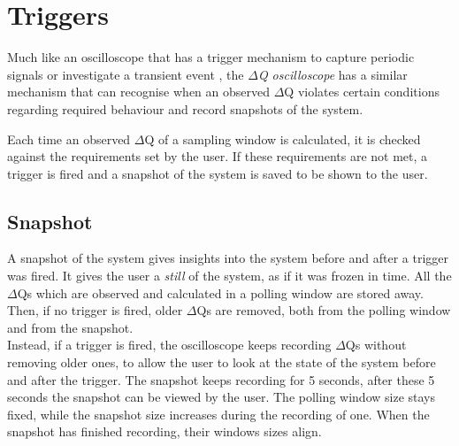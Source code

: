 \section{Triggers}
    Much like an oscilloscope that has a trigger mechanism to capture periodic signals or investigate a transient event \cite{osc-t}, the \textit{$\Delta$Q oscilloscope} has a similar mechanism that can recognise when an observed $\Delta$Q violates certain conditions regarding required behaviour and record snapshots of the system.

    Each time an observed $\Delta$Q of a sampling window is calculated, it is checked against the requirements set by the user. If these requirements are not met, a trigger is fired and a snapshot of the system is saved to be shown to the user. 
    
    \subsection{Snapshot}
    A snapshot of the system gives insights into the system before and after a trigger was fired. It gives the user a \textit{still} of the system, as if it was frozen in time. All the $\Delta$Qs which are observed and calculated in a polling window are stored away. Then, if no trigger is fired, older $\Delta$Qs are removed, both from the polling window and from the snapshot. \\
    Instead, if a trigger is fired, the oscilloscope keeps recording $\Delta$Qs without removing older ones, to allow the user to look at the state of the system before and after the trigger. The snapshot keeps recording for 5 seconds, after these 5 seconds the snapshot can be viewed by the user. The polling window size stays fixed, while the snapshot size increases during the recording of one. When the snapshot has finished recording, their windows sizes align.
    
